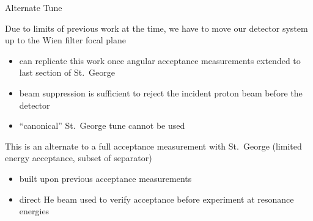 \documentclass[10pt]{beamer}
\begin{document}
\begin{frame}[fragile]{Alternate Tune}

    Due to limits of previous work at the time, we have to move our detector system up to the Wien filter focal plane
    \begin{itemize}
        \item can replicate this work once angular acceptance measurements extended to last section of St.\ George
        \item beam suppression is sufficient to reject the incident proton beam before the detector
        \item ``canonical'' St.\ George tune cannot be used
    \end{itemize}
    
    This is an alternate to a full acceptance measurement with St.\ George (limited energy acceptance, subset of separator)
    \begin{itemize}
        \item built upon previous acceptance measurements
        \item direct He beam used to verify acceptance before experiment at resonance energies
    \end{itemize}

\end{frame}
\end{document}
